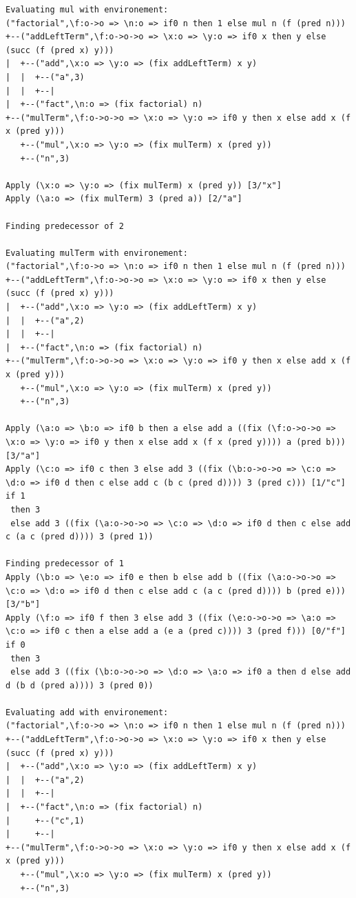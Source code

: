 \documentclass[12pt,a4paper]{report}
\theoremstyle{definition}
\theoremstyle{definition}
\theoremstyle{remark}
\begin{document}
\begin{verbatim}
Evaluating mul with environement:
("factorial",\f:o->o => \n:o => if0 n then 1 else mul n (f (pred n)))
+--("addLeftTerm",\f:o->o->o => \x:o => \y:o => if0 x then y else (succ (f (pred x) y)))
|  +--("add",\x:o => \y:o => (fix addLeftTerm) x y)
|  |  +--("a",3)
|  |  +--|
|  +--("fact",\n:o => (fix factorial) n)
+--("mulTerm",\f:o->o->o => \x:o => \y:o => if0 y then x else add x (f x (pred y)))
   +--("mul",\x:o => \y:o => (fix mulTerm) x (pred y))
   +--("n",3)

Apply (\x:o => \y:o => (fix mulTerm) x (pred y)) [3/"x"] 
Apply (\a:o => (fix mulTerm) 3 (pred a)) [2/"a"] 

Finding predecessor of 2

Evaluating mulTerm with environement:
("factorial",\f:o->o => \n:o => if0 n then 1 else mul n (f (pred n)))
+--("addLeftTerm",\f:o->o->o => \x:o => \y:o => if0 x then y else (succ (f (pred x) y)))
|  +--("add",\x:o => \y:o => (fix addLeftTerm) x y)
|  |  +--("a",2)
|  |  +--|
|  +--("fact",\n:o => (fix factorial) n)
+--("mulTerm",\f:o->o->o => \x:o => \y:o => if0 y then x else add x (f x (pred y)))
   +--("mul",\x:o => \y:o => (fix mulTerm) x (pred y))
   +--("n",3)

Apply (\a:o => \b:o => if0 b then a else add a ((fix (\f:o->o->o => \x:o => \y:o => if0 y then x else add x (f x (pred y)))) a (pred b))) [3/"a"] 
Apply (\c:o => if0 c then 3 else add 3 ((fix (\b:o->o->o => \c:o => \d:o => if0 d then c else add c (b c (pred d)))) 3 (pred c))) [1/"c"] 
if 1
 then 3
 else add 3 ((fix (\a:o->o->o => \c:o => \d:o => if0 d then c else add c (a c (pred d)))) 3 (pred 1))

Finding predecessor of 1
Apply (\b:o => \e:o => if0 e then b else add b ((fix (\a:o->o->o => \c:o => \d:o => if0 d then c else add c (a c (pred d)))) b (pred e))) [3/"b"] 
Apply (\f:o => if0 f then 3 else add 3 ((fix (\e:o->o->o => \a:o => \c:o => if0 c then a else add a (e a (pred c)))) 3 (pred f))) [0/"f"] 
if 0
 then 3
 else add 3 ((fix (\b:o->o->o => \d:o => \a:o => if0 a then d else add d (b d (pred a)))) 3 (pred 0))

Evaluating add with environement:
("factorial",\f:o->o => \n:o => if0 n then 1 else mul n (f (pred n)))
+--("addLeftTerm",\f:o->o->o => \x:o => \y:o => if0 x then y else (succ (f (pred x) y)))
|  +--("add",\x:o => \y:o => (fix addLeftTerm) x y)
|  |  +--("a",2)
|  |  +--|
|  +--("fact",\n:o => (fix factorial) n)
|     +--("c",1)
|     +--|
+--("mulTerm",\f:o->o->o => \x:o => \y:o => if0 y then x else add x (f x (pred y)))
   +--("mul",\x:o => \y:o => (fix mulTerm) x (pred y))
   +--("n",3)


\end{verbatim}
\end{document}
